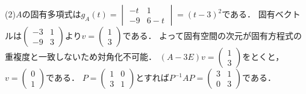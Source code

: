 \documentclass[
		book,
		head_space=20mm,
		foot_space=20mm,
		gutter=10mm,
		line_length=190mm
]{jlreq}
\begin{document}
(2)$A$の固有多項式は$g_A(t)=\begin{vmatrix}
-t&1\\
-9&6-t
\end{vmatrix}=(t-3)^2$である．
固有ベクトルは$\begin{pmatrix}
-3&1\\
-9&3
\end{pmatrix}$より$v=\begin{pmatrix}
1\\3
\end{pmatrix}$である．
よって固有空間の次元が固有方程式の重複度と一致しないため対角化不可能．
$(A-3E)v=\begin{pmatrix}
1\\3
\end{pmatrix}$をとくと，$v=\begin{pmatrix}
0\\1
\end{pmatrix}$である．
$P=\begin{pmatrix}
1&0\\
3&1
\end{pmatrix}$とすれば$P^{-1}AP=\begin{pmatrix}
3&1\\
0&3
\end{pmatrix}$である．
\end{document}
